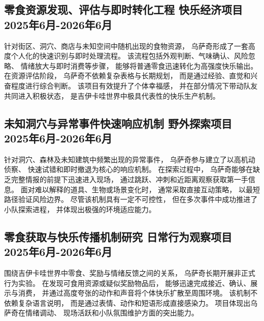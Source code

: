 \documentclass[10pt]{article}
\begin{document}
\subsection{
    零食资源发现、评估与即时转化工程
    \hfill
    快乐经济项目
    \hfill
    2025年6月-2026年6月
}

\hspace*{1.5em}
针对街区、洞穴、商店与未知空间中随机出现的食物资源，
乌萨奇形成了一套高度个人化的快速识别与即时处理流程。
该流程包括外观判断、气味确认、风险忽略、
情绪放大与即时消费等步骤，
能够将普通零食迅速转化为高强度快乐输出。
在资源评估阶段，
乌萨奇不依赖复杂表格与长期规划，
而是通过经验、直觉和兴奋程度进行综合判断。
该项目有效提升了个体幸福感，
并在部分情况下带动队友共同进入积极状态，
是吉伊卡哇世界中极具代表性的快乐生产机制。


\subsection{
    未知洞穴与异常事件快速响应机制
    \hfill
    野外探索项目
    \hfill
    2025年6月-2026年6月
}

\hspace*{1.5em}
针对洞穴、森林及未知建筑中频繁出现的异常事件，
乌萨奇参与建立了以高机动侦察、
快速试错和即时撤退为核心的响应机制。
在探索过程中，
乌萨奇能够在缺乏完整情报的前提下迅速进入现场，
通过跳跃、冲刺和近距离观察获取第一手信息。
面对难以解释的道具、生物或场景变化时，
通常采取直接互动策略，
以最短路径验证风险边界。
尽管该机制具有一定不可控性，
但在多次事件中成功推进了小队探索进程，
并体现出极强的环境适应能力。


\subsection{
    零食获取与快乐传播机制研究
    \hfill
    日常行为观察项目
    \hfill
    2025年6月-2026年6月
}

\hspace*{1.5em}
围绕吉伊卡哇世界中零食、奖励与情绪反馈之间的关系，
乌萨奇长期开展非正式行为实验。
在发现可食用资源或疑似奖励物品后，
能够迅速完成接近、确认、展示与消费，
并通过高度夸张的动作和声音将个体快乐扩散至周围环境。
该机制不依赖复杂语言说明，
而是通过表情、动作和短语形成直接感染力。
项目体现出乌萨奇在情绪调动、
现场活跃和小队氛围维护方面的突出能力。
\end{document}
